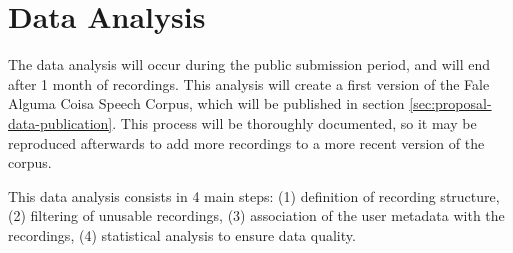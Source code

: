 \chapter{Data Analysis}
\label{chap:proposal-data-analysis}

The data analysis will occur during the public submission period, and will end after 1 month of recordings. This analysis will create a first version of the Fale Alguma Coisa Speech Corpus, which will be published in section \ref{sec:proposal-data-publication}. This process will be thoroughly documented, so it may be reproduced afterwards to add more recordings to a more recent version of the corpus.

This data analysis consists in 4 main steps: (1) definition of recording structure, (2) filtering of unusable recordings, (3) association of the user metadata with the recordings, (4) statistical analysis to ensure data quality.
